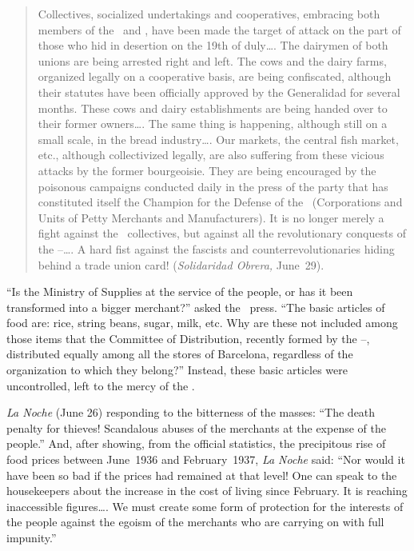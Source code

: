 \begin{quotation}
  Collectives, socialized undertakings and cooperatives, embracing both members of the \UGT\ and \CNT\kn, have been made the target of attack on the part of those who hid in desertion on the 19th of duly\dots.
  The dairymen of both unions are being arrested right and left. The cows and the dairy farms, organized legally on a cooperative basis, are being confiscated, although their statutes have been officially approved by the Generalidad for several months. These cows and dairy establishments are being hand\-ed over to their former owners\dots.
  The same thing is happening, although still on a small scale, in the bread industry\dots.
  Our markets, the central fish market, etc., although collectivized legally\kn, are also suffering from these vicious attacks by the former bourgeoisie. They are being encouraged by the poisonous campaigns conducted daily in the press of the party that has constituted itself the Champion for the Defense of the \GEPCI\ (Corporations and Units of Petty Merchants and Manufacturers). It is no longer merely a fight against the \CNT\ collectives, but against all the revolutionary conquests of the \UGT--\CNT\dots.
  A hard fist against the fascists and counterrevolutionaries hiding behind a trade union card! (\emph{Solidaridad Obrera,} June~29).\indexSolidaridadObrera
\end{quotation}

``Is the Ministry of Supplies at the service of the people, or has it been transformed into a bigger merchant?\kp'' asked the \CNT\ press. ``The basic articles of food are: rice, string beans, sugar\kn, milk, etc. Why are these not included among those items that the Committee of Distribution, recently formed by the \UGT--\CNT, distributed equally among all the stores of Barcelona, regardless of the organization to which they belong?\kp'' Instead, these basic articles were uncontrolled, left to the mercy of the \GEPCI.

\emph{La Noche} (June 26) responding to the bitterness of the masses: ``The death penalty for thieves! Scandalous abuses of the merchants at the expense of the people.\kn\kn'' And, after showing, from the official statistics, the precipitous rise of food prices between June~1936 and February~1937\kn, \emph{La Noche} said: ``Nor would it have been so bad if the prices had remained at that level! One can speak to the housekeepers about the increase in the cost of living since February. It is reaching inaccessible figures\dots. We must create some form of protection for the interests of the people against the egoism of the merchants who are carrying on with full impunity.\kn\kn''


